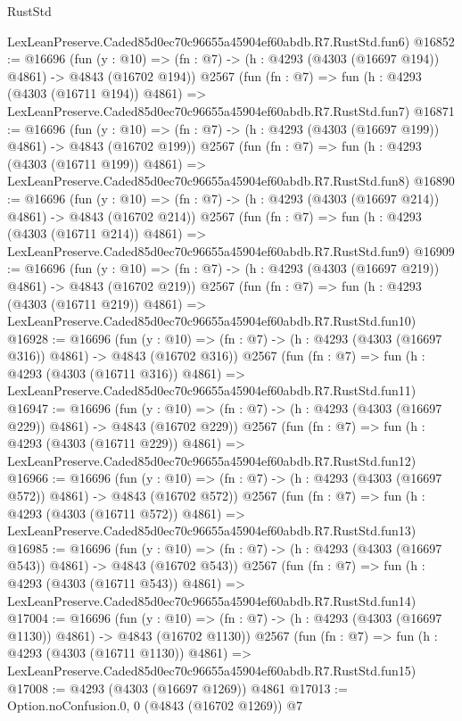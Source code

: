 \begin{lexlean}{RustStd}
\begin{coremodule}
    LexLeanPreserve.Caded85d0ec70c96655a45904ef60abdb.R7.RustStd.fun6)
@16852 := @16696
    (fun (y : @10) => (fn : @7) -> (h : @4293 (@4303 (@16697 @194)) @4861) -> @4843 (@16702 @194))
    @2567
    (fun (fn : @7) =>
    fun (h : @4293 (@4303 (@16711 @194)) @4861) =>
    LexLeanPreserve.Caded85d0ec70c96655a45904ef60abdb.R7.RustStd.fun7)
@16871 := @16696
    (fun (y : @10) => (fn : @7) -> (h : @4293 (@4303 (@16697 @199)) @4861) -> @4843 (@16702 @199))
    @2567
    (fun (fn : @7) =>
    fun (h : @4293 (@4303 (@16711 @199)) @4861) =>
    LexLeanPreserve.Caded85d0ec70c96655a45904ef60abdb.R7.RustStd.fun8)
@16890 := @16696
    (fun (y : @10) => (fn : @7) -> (h : @4293 (@4303 (@16697 @214)) @4861) -> @4843 (@16702 @214))
    @2567
    (fun (fn : @7) =>
    fun (h : @4293 (@4303 (@16711 @214)) @4861) =>
    LexLeanPreserve.Caded85d0ec70c96655a45904ef60abdb.R7.RustStd.fun9)
@16909 := @16696
    (fun (y : @10) => (fn : @7) -> (h : @4293 (@4303 (@16697 @219)) @4861) -> @4843 (@16702 @219))
    @2567
    (fun (fn : @7) =>
    fun (h : @4293 (@4303 (@16711 @219)) @4861) =>
    LexLeanPreserve.Caded85d0ec70c96655a45904ef60abdb.R7.RustStd.fun10)
@16928 := @16696
    (fun (y : @10) => (fn : @7) -> (h : @4293 (@4303 (@16697 @316)) @4861) -> @4843 (@16702 @316))
    @2567
    (fun (fn : @7) =>
    fun (h : @4293 (@4303 (@16711 @316)) @4861) =>
    LexLeanPreserve.Caded85d0ec70c96655a45904ef60abdb.R7.RustStd.fun11)
@16947 := @16696
    (fun (y : @10) => (fn : @7) -> (h : @4293 (@4303 (@16697 @229)) @4861) -> @4843 (@16702 @229))
    @2567
    (fun (fn : @7) =>
    fun (h : @4293 (@4303 (@16711 @229)) @4861) =>
    LexLeanPreserve.Caded85d0ec70c96655a45904ef60abdb.R7.RustStd.fun12)
@16966 := @16696
    (fun (y : @10) => (fn : @7) -> (h : @4293 (@4303 (@16697 @572)) @4861) -> @4843 (@16702 @572))
    @2567
    (fun (fn : @7) =>
    fun (h : @4293 (@4303 (@16711 @572)) @4861) =>
    LexLeanPreserve.Caded85d0ec70c96655a45904ef60abdb.R7.RustStd.fun13)
@16985 := @16696
    (fun (y : @10) => (fn : @7) -> (h : @4293 (@4303 (@16697 @543)) @4861) -> @4843 (@16702 @543))
    @2567
    (fun (fn : @7) =>
    fun (h : @4293 (@4303 (@16711 @543)) @4861) =>
    LexLeanPreserve.Caded85d0ec70c96655a45904ef60abdb.R7.RustStd.fun14)
@17004 := @16696
    (fun (y : @10) => (fn : @7) -> (h : @4293 (@4303 (@16697 @1130)) @4861) -> @4843 (@16702 @1130))
    @2567
    (fun (fn : @7) =>
    fun (h : @4293 (@4303 (@16711 @1130)) @4861) =>
    LexLeanPreserve.Caded85d0ec70c96655a45904ef60abdb.R7.RustStd.fun15)
@17008 := @4293 (@4303 (@16697 @1269)) @4861
@17013 := Option.noConfusion.{0, 0} (@4843 (@16702 @1269)) @7

\end{coremodule}
\end{lexlean}

